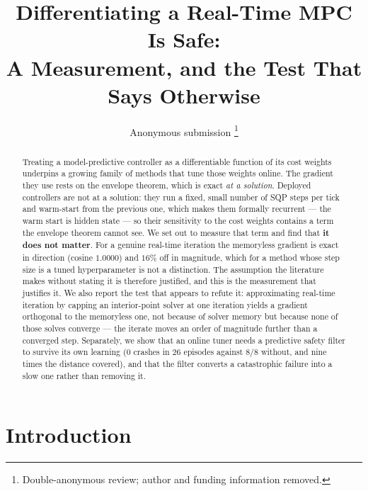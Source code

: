 \documentclass[letterpaper, 10 pt, conference]{ieeeconf}
\title{\LARGE\bf Differentiating a Real-Time MPC Is Safe:\\
A Measurement, and the Test That Says Otherwise}
\author{Anonymous submission%
\thanks{Double-anonymous review; author and funding information removed.}}
\begin{document}
\maketitle
\thispagestyle{empty}
\pagestyle{empty}

\begin{abstract}
Treating a model-predictive controller as a differentiable function of its cost
weights underpins a growing family of methods that tune those weights online.
The gradient they use rests on the envelope theorem, which is exact \emph{at a
solution}. Deployed controllers are not at a solution: they run a fixed, small
number of SQP steps per tick and warm-start from the previous one, which makes
them formally recurrent --- the warm start is hidden state --- so their
sensitivity to the cost weights contains a term the envelope theorem cannot
see. We set out to measure that term and find that \textbf{it does not matter}.
For a genuine real-time iteration the memoryless gradient is exact in direction
(cosine $1.0000$) and $16\%$ off in magnitude, which for a method whose step
size is a tuned hyperparameter is not a distinction. The assumption the
literature makes without stating it is therefore justified, and this is the
measurement that justifies it. We also report the test that appears to refute
it: approximating real-time iteration by capping an interior-point solver at
one iteration yields a gradient orthogonal to the memoryless one, not because
of solver memory but because none of those solves converge --- the iterate
moves an order of magnitude further than a converged step. Separately, we show
that an online tuner needs a predictive safety filter to survive its own
learning ($0$ crashes in $26$ episodes against $8/8$ without, and nine times
the distance covered), and that the filter converts a catastrophic failure into
a slow one rather than removing it.
\end{abstract}

\section{Introduction}

\end{document}
